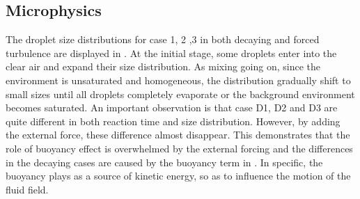 \subsection{Microphysics}
The droplet size distributions for case 1, 2 ,3 in both decaying and forced
turbulence are displayed in . At the initial stage, some
droplets enter into the clear air and expand their size distribution. As mixing
going on, since the environment is unsaturated and homogeneous, the
distribution gradually shift to small sizes until all droplets completely
evaporate or the background environment becomes saturated.  An important
observation is that case D1, D2 and D3 are quite different in both reaction
time and size distribution. However, by adding the external force, these
difference almost disappear. This demonstrates that the role of buoyancy effect
is overwhelmed by the external forcing and the differences in the decaying
cases are caused by the buoyancy term in . In specific, the
buoyancy plays as a source of kinetic energy, so as to influence the motion of
the fluid field.  

\begin{figure}[H]\centering
{}
\end{figure}

